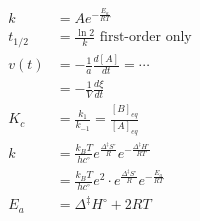 \begin{align*}
k&=Ae^{-\frac{E_a}{RT}}\\
t_{1/2}&=\frac{\ln{2}}{k} \textrm{ first-order only}\\
v(t)&=-\frac{1}{a}\frac{d\left[ A\right]}{dt}=\cdots\\
&=-\frac{1}{V}\frac{d\xi}{dt}\\
K_c&=\frac{k_1}{k_{-1}}=\frac{\left[B\right]_{eq}}{\left[A\right]_{eq}}\\
k&=\frac{k_BT}{hc^{\circ}}e^{\frac{\Delta^\ddagger S^{\circ} }{R}}e^{-\frac{\Delta^\ddagger H^{\circ}}{RT}}\\
&=\frac{k_BT}{hc^{\circ}}e^2\cdot e^{\frac{\Delta^\ddagger S^{\circ}}{R}}e^{-\frac{E_a}{RT}}\\
E_a&=\Delta^\ddagger H^{\circ}+2RT\\
\end{align*}
